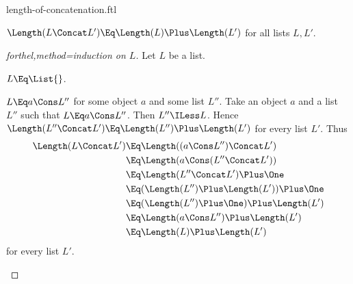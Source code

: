 \documentclass{stex}
\begin{document}
\begin{smodule}{length-of-concatenation.ftl}


\begin{proposition*}[forthel]
  $\Length(L \Concat L') \Eq \Length(L) \Plus \Length(L')$ for all lists $L, L'$.
\end{proposition*}
\begin{proof}[forthel,method=induction on $L$]
  Let $L$ be a list.

  \begin{case}{$L \Eq \List{}$.}\end{case}

  \begin{case}{$L \Eq a \Cons L''$ for some object $a$ and some list $L''$.}
    Take an object $a$ and a list $L''$ such that $L \Eq a \Cons L''$.
    Then $L'' \ILess L$.
    Hence $\Length(L'' \Concat L') \Eq \Length(L'') \Plus \Length(L')$ for every list $L'$.
    Thus
    \begin{align*}
      \Length(L \Concat L')
        &\Eq \Length((a \Cons L'') \Concat L')\\
        &\Eq \Length(a \Cons (L'' \Concat L'))\\
        &\Eq \Length(L'' \Concat L') \Plus \One\\
        &\Eq (\Length(L'') \Plus \Length(L')) \Plus \One\\
        &\Eq (\Length(L'') \Plus \One) \Plus \Length(L')\\
        &\Eq \Length(a \Cons L'') \Plus \Length(L')\\
        &\Eq \Length(L) \Plus \Length(L')
    \end{align*}
    for every list $L'$.
  \end{case}
\end{proof}

\end{smodule}
\end{document}
